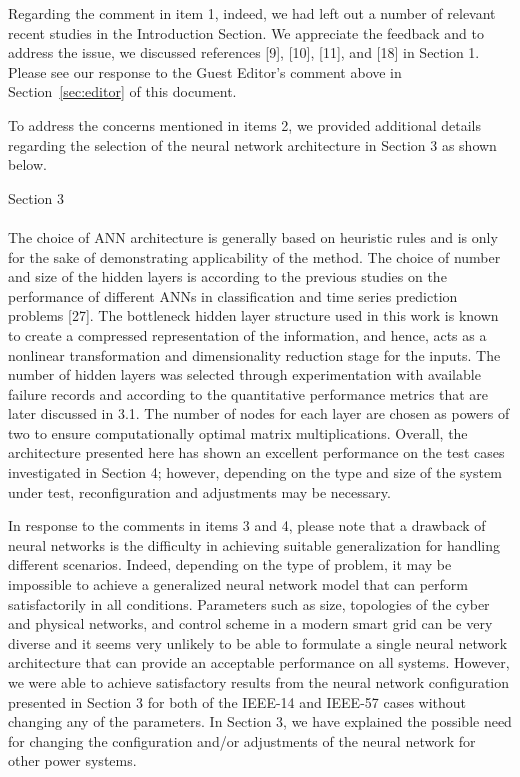 \documentclass{article}
\newenvironment{response}{
  \doublespacing
  \setlength\parindent{0.05\linewidth}
  \ttfamily
}{}
\newenvironment{textblock}[1]
{\begin{tcolorbox}[breakable,enhanced]{#1 \\ \\}}
{\end{tcolorbox}}
\begin{document}
\begin{response}
Regarding the comment in item 1, indeed, we had left out a number of relevant recent studies in the Introduction Section. We appreciate the feedback and to address the issue, we discussed references [9], [10], [11], and [18] in Section 1. Please see our response to the Guest Editor's comment above in Section~\ref{sec:editor} of this document.

To address the concerns mentioned in items 2, we provided additional details regarding the selection of the neural network architecture in Section 3 as shown below.

\begin{textblock}{Section 3}
The choice of ANN architecture is generally based on heuristic rules and is only for the sake of demonstrating applicability of the method. The choice of number and size of the hidden layers is according to the previous studies on the performance of different ANNs in classification and time series prediction problems [27]. The bottleneck hidden layer structure used in this work is known to create a compressed representation of the information, and hence, acts as a nonlinear transformation and dimensionality reduction stage for the inputs. The number of hidden layers was selected through experimentation with available failure records and according to the quantitative performance metrics that are later discussed in 3.1. The number of nodes for each layer are chosen as powers of two to ensure computationally optimal matrix multiplications. Overall, the architecture presented here has shown an excellent performance on the test cases investigated in Section 4; however, depending on the type and size of the system under test, reconfiguration and adjustments may be necessary.
\end{textblock}

In response to the comments in items 3 and 4, please note that a drawback of neural networks is the difficulty in achieving suitable generalization for handling different scenarios. Indeed, depending on the type of problem, it may be impossible to achieve a generalized neural network model that can perform satisfactorily in all conditions. Parameters such as size, topologies of the cyber and physical networks, and control scheme in a modern smart grid can be very diverse and it seems very unlikely to be able to formulate a single neural network architecture that can provide an acceptable performance on all systems. However, we were able to achieve satisfactory results from the neural network configuration presented in Section 3 for both of the IEEE-14 and IEEE-57 cases without changing any of the parameters. In Section 3, we have explained the possible need for changing the configuration and/or adjustments of the neural network for other power systems.


\end{response}
\end{document}
